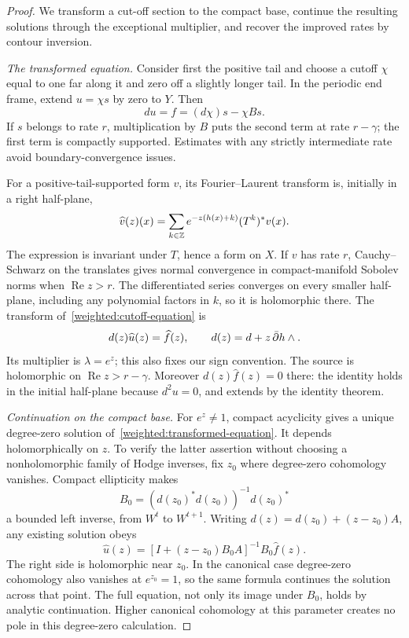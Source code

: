 \begin{proof}
We transform a cut-off section to the compact base, continue the
resulting solutions through the exceptional multiplier, and recover
the improved rates by contour inversion.

\emph{The transformed equation.}
Consider first the positive tail and
choose a cutoff $\chi$ equal to one far along it and zero off a slightly
longer tail. In the periodic end frame, extend $u=\chi s$ by zero to
$Y$. Then
\begin{equation}\label{weighted:cutoff-equation}
 du=f=(d\chi)s-\chi Bs.
\end{equation}
If $s$ belongs to rate $r$, multiplication by $B$ puts the second term
at rate $r-\gamma$; the first term is compactly supported. Estimates
with any strictly intermediate rate avoid boundary-convergence issues.

For a positive-tail-supported form $v$, its Fourier--Laurent transform
is, initially in a right half-plane,
\begin{equation}\label{weighted:transform}
 \widehat v(z)(x)=
 \sum_{k\in\mathbb Z}e^{-z(h(x)+k)}(T^{k})^*v(x).
\end{equation}
The expression is invariant under $T$, hence a form on $X$. If $v$ has
rate $r$, Cauchy--Schwarz on the translates gives normal convergence
in compact-manifold Sobolev norms when $\operatorname{Re}z>r$.
The differentiated series converges on every smaller half-plane,
including any polynomial factors in $k$, so it is holomorphic there.
The transform of~\eqref{weighted:cutoff-equation} is
\begin{equation}\label{weighted:transformed-equation}
 d(z)\widehat u(z)=\widehat f(z),\qquad
 d(z)=d+z\,\bar\partial h\wedge.
\end{equation}
Its multiplier is $\lambda=e^z$; this also fixes our sign convention.
The source is holomorphic on $\operatorname{Re}z>r-\gamma$.
Moreover $d(z)\widehat f(z)=0$ there: the identity holds in the
initial half-plane because $d^2u=0$, and extends by the identity theorem.

\emph{Continuation on the compact base.}
For $e^z\ne1$, compact acyclicity gives a unique degree-zero solution
of~\eqref{weighted:transformed-equation}. It depends holomorphically on
$z$. To verify the latter assertion without choosing a nonholomorphic
family of Hodge inverses, fix $z_0$ where degree-zero cohomology vanishes.
Compact ellipticity makes
\[
 B_0=(d(z_0)^*d(z_0))^{-1}d(z_0)^*
\]
a bounded left inverse, from $W^t$ to $W^{t+1}$. Writing
$d(z)=d(z_0)+(z-z_0)A$, any existing solution obeys
\begin{equation}\label{weighted:left-inverse}
 \widehat u(z)=
 [I+(z-z_0)B_0A]^{-1}B_0\widehat f(z).
\end{equation}
The right side is holomorphic near $z_0$. In the canonical case
degree-zero cohomology also vanishes at $e^{z_0}=1$, so the same formula
continues the solution across that point. The full equation, not only
its image under $B_0$, holds by analytic continuation. Higher canonical
cohomology at this parameter creates no pole in this degree-zero
calculation.


\end{proof}
